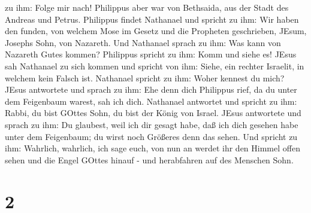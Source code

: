 zu ihm: Folge mir nach!  Philippus aber war von Bethsaida,
aus der Stadt des Andreas und Petrus.  Philippus findet
Nathanael und spricht zu ihm: Wir haben den funden, von welchem Mose im
Gesetz und die Propheten geschrieben, JEsum, Josephs Sohn, von Nazareth.
 Und Nathanael sprach zu ihm: Was kann von Nazareth Gutes
kommen? Philippus spricht zu ihm: Komm und siehe es!  JEsus
sah Nathanael zu sich kommen und spricht von ihm: Siehe, ein rechter
Israelit, in welchem kein Falsch ist.  Nathanael spricht zu
ihm: Woher kennest du mich? JEsus antwortete und sprach zu ihm: Ehe denn
dich Philippus rief, da du unter dem Feigenbaum warest, sah ich dich.
 Nathanael antwortet und spricht zu ihm: Rabbi, du bist
GOttes Sohn, du bist der König von Israel.  JEsus
antwortete und sprach zu ihm: Du glaubest, weil ich dir gesagt habe, daß
ich dich gesehen habe unter dem Feigenbaum; du wirst noch Größeres denn
das sehen.  Und spricht zu ihm: Wahrlich, wahrlich, ich
sage euch, von nun an werdet ihr den Himmel offen sehen und die Engel
GOttes hinauf - und herabfahren auf des Menschen Sohn.

\hypertarget{section-1}{%
\section{2}\label{section-1}}

